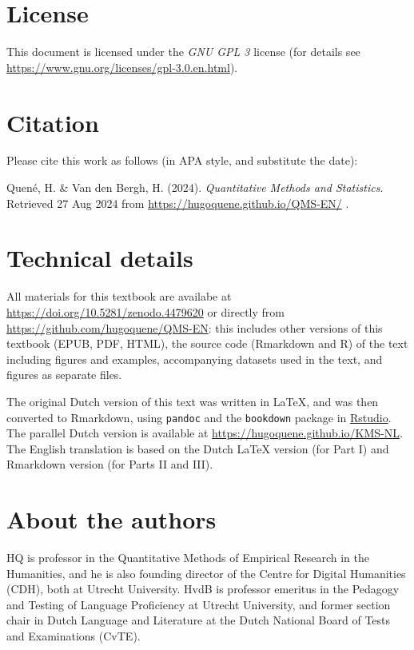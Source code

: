 \documentclass[
]{book}
\begin{document}
\section*{License}\label{license}

This document is licensed under the \emph{GNU GPL 3} license (for details see
\url{https://www.gnu.org/licenses/gpl-3.0.en.html}).

\section*{Citation}\label{citation}

Please cite this work as follows (in APA style, and substitute the date):

Quené, H. \& Van den Bergh, H. (2024). \emph{Quantitative Methods and Statistics}.
Retrieved 27 Aug 2024 from \url{https://hugoquene.github.io/QMS-EN/} .

\section*{Technical details}\label{technical-details}

All materials for this textbook are availabe at
\url{https://doi.org/10.5281/zenodo.4479620} or directly from
\url{https://github.com/hugoquene/QMS-EN}:
this includes other versions of this textbook (EPUB, PDF, HTML), the source code (Rmarkdown and R) of the text including figures and examples, accompanying datasets used in the text, and figures as separate files.

The original Dutch version of this text was written in LaTeX, and was then converted to Rmarkdown, using \texttt{pandoc} \citep{pandoc} and the \texttt{bookdown} package \citep{R-bookdown} in \href{https://www.rstudio.com}{Rstudio}. The parallel Dutch version is available at \url{https://hugoquene.github.io/KMS-NL}.
The English translation is based on the Dutch LaTeX version (for Part I) and Rmarkdown version (for Parts II and III).

\section*{About the authors}\label{about-the-authors}

HQ is professor in the Quantitative Methods of Empirical Research in the Humanities, and he is also founding director of the Centre for Digital Humanities (CDH), both at Utrecht University.
HvdB is professor emeritus in the Pedagogy and Testing of Language Proficiency at Utrecht University, and former section chair in Dutch Language and Literature at the Dutch National Board of Tests and Examinations (CvTE).
\end{document}
